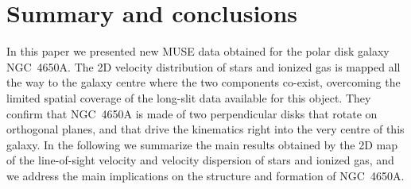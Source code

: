 \documentclass{aa}
\begin{document}

\section{Summary and conclusions}


In this paper we presented new MUSE data obtained for the polar disk
galaxy NGC~4650A. The 2D velocity distribution of stars and
  ionized gas is mapped all the way to the galaxy centre where the
  two components co-exist, overcoming the limited spatial coverage of
  the long-slit data available for this object. They confirm that NGC~4650A is made of two perpendicular disks that rotate on  orthogonal planes, and that drive the kinematics right into the very centre of this galaxy.  
%
In the following we summarize the main results obtained by the
2D map of the line-of-sight velocity and velocity
dispersion of stars and  ionized gas, and we address the main
implications on the structure and formation of NGC~4650A.
\end{document}
